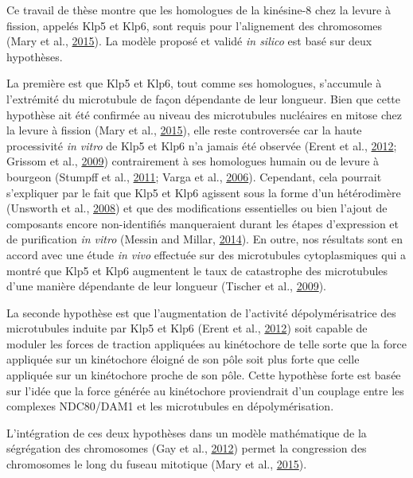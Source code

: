 \documentclass[12pt,a4paper,twoside,openright]{book}
\begin{document}
Ce travail de thèse montre que les homologues de la kinésine-8 chez la
levure à fission, appelés Klp5 et Klp6, sont requis pour l'alignement
des chromosomes (Mary et al., \protect\hyperlink{ref-Mary2015}{2015}).
La modèle proposé et validé \emph{in silico} est basé sur deux
hypothèses.

La première est que Klp5 et Klp6, tout comme ses homologues, s'accumule
à l'extrémité du microtubule de façon dépendante de leur longueur. Bien
que cette hypothèse ait été confirmée au niveau des microtubules
nucléaires en mitose chez la levure à fission (Mary et al.,
\protect\hyperlink{ref-Mary2015}{2015}), elle reste controversée car la
haute processivité \emph{in vitro} de Klp5 et Klp6 n'a jamais été
observée (Erent et al., \protect\hyperlink{ref-Erent2012}{2012}; Grissom
et al., \protect\hyperlink{ref-Grissom2009}{2009}) contrairement à ses
homologues humain ou de levure à bourgeon (Stumpff et al.,
\protect\hyperlink{ref-Stumpff2011a}{2011}; Varga et al.,
\protect\hyperlink{ref-Varga2006}{2006}). Cependant, cela pourrait
s'expliquer par le fait que Klp5 et Klp6 agissent sous la forme d'un
hétérodimère (Unsworth et al.,
\protect\hyperlink{ref-Unsworth2008}{2008}) et que des modifications
essentielles ou bien l'ajout de composants encore non-identifiés
manqueraient durant les étapes d'expression et de purification \emph{in
vitro} (Messin and Millar, \protect\hyperlink{ref-Messin2014}{2014}). En
outre, nos résultats sont en accord avec une étude \emph{in vivo}
effectuée sur des microtubules cytoplasmiques qui a montré que Klp5 et
Klp6 augmentent le taux de catastrophe des microtubules d'une manière
dépendante de leur longueur (Tischer et al.,
\protect\hyperlink{ref-Tischer2009}{2009}).

La seconde hypothèse est que l'augmentation de l'activité
dépolymérisatrice des microtubules induite par Klp5 et Klp6 (Erent et
al., \protect\hyperlink{ref-Erent2012}{2012}) soit capable de moduler
les forces de traction appliquées au kinétochore de telle sorte que la
force appliquée sur un kinétochore éloigné de son pôle soit plus forte
que celle appliquée sur un kinétochore proche de son pôle. Cette
hypothèse forte est basée sur l'idée que la force générée au kinétochore
proviendrait d'un couplage entre les complexes NDC80/DAM1 et les
microtubules en dépolymérisation.

L'intégration de ces deux hypothèses dans un modèle mathématique de la
ségrégation des chromosomes (Gay et al.,
\protect\hyperlink{ref-Gay2012a}{2012}) permet la congression des
chromosomes le long du fuseau mitotique (Mary et al.,
\protect\hyperlink{ref-Mary2015}{2015}).
\end{document}
